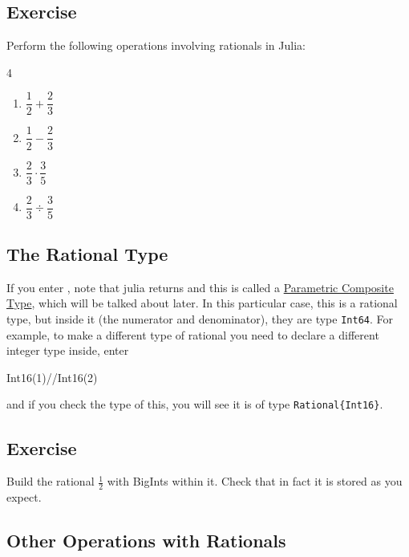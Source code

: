 \subsection{Exercise}

Perform the following operations involving rationals in Julia:

\begin{multicols}{4}
\begin{enumerate}
\item  $\dfrac{1}{2} + \dfrac{2}{3}$
\item  $\dfrac{1}{2} - \dfrac{2}{3}$
\item  $\dfrac{2}{3} \cdot \dfrac{3}{5}$
\item  $\dfrac{2}{3} \div \dfrac{3}{5}$
\end{enumerate}
\end{multicols}

\hypertarget{the-rational-type}{%
\subsection{The Rational Type}\label{the-rational-type}}

If you enter , note that julia returns  \printpythontex[verb] and this is called a
\href{https://docs.julialang.org/en/stable/manual/types/\#Parametric-Composite-Types-1}{Parametric Composite Type}, which will be talked about later. In this particular case, this is a rational type, but inside it (the numerator and denominator), they are type \texttt{Int64}. For example, to make a different type of rational you need to declare a different integer type inside, enter
\begin{jlblock}[types]
Int16(1)//Int16(2)
\end{jlblock}
%
and if you check the type of this, you will see it is of type \texttt{Rational\{Int16\}}.

\subsection{Exercise}

Build the rational $\frac{1}{2}$ with BigInts within it. Check that in
fact it is stored as you expect.

\hypertarget{other-operations-with-rationals}{%
\subsection{Other Operations with
Rationals}\label{other-operations-with-rationals}}

